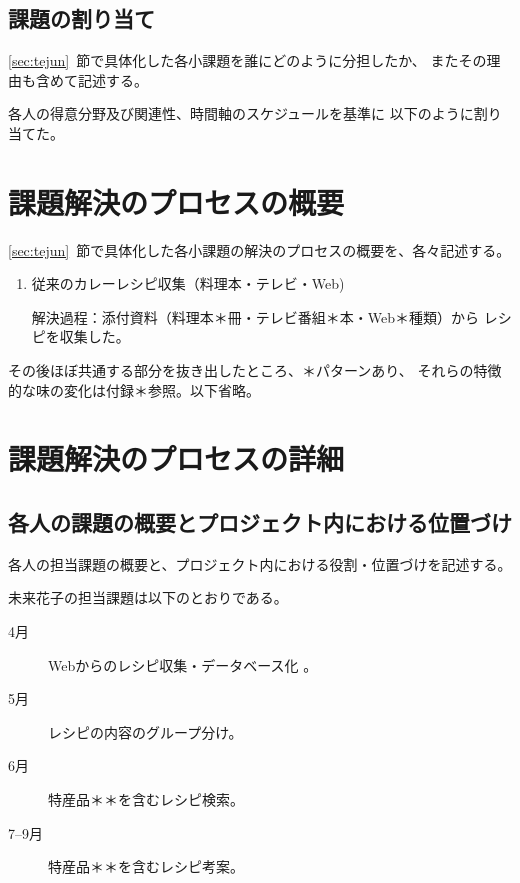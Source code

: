 \documentclass[openany,11pt,papersize]{jsbook}
\begin{document}

\section{課題の割り当て}
\begin{hissu}
\ref{sec:tejun}~節で具体化した各小課題を誰にどのように分担したか、
またその理由も含めて記述する。
\end{hissu}

各人の得意分野及び関連性、時間軸のスケジュールを基準に
以下のように割り当てた。


\chapter{課題解決のプロセスの概要}
\begin{hissu}
\ref{sec:tejun}~節で具体化した各小課題の解決のプロセスの概要を、各々記述する。
\end{hissu}

\begin{enumerate}
 \item 従来のカレーレシピ収集（料理本・テレビ・Web)
\par 解決過程：添付資料（料理本＊冊・テレビ番組＊本・Web＊種類）から
     レシピを収集した。
\end{enumerate}


その後ほぼ共通する部分を抜き出したところ、＊パターンあり、
それらの特徴的な味の変化は付録＊参照。以下省略。




\chapter{課題解決のプロセスの詳細}

\section{各人の課題の概要とプロジェクト内における位置づけ}
\begin{hissu}
各人の担当課題の概要と、プロジェクト内における役割・位置づけを記述する。
\end{hissu}

未来花子の担当課題は以下のとおりである。
\begin{description}
 \item[4月] Webからのレシピ収集・データベース化 。
 \item[5月] レシピの内容のグループ分け。
 \item[6月] 特産品＊＊を含むレシピ検索。
 \item[7--9月]特産品＊＊を含むレシピ考案。
\end{description}
\end{document}

